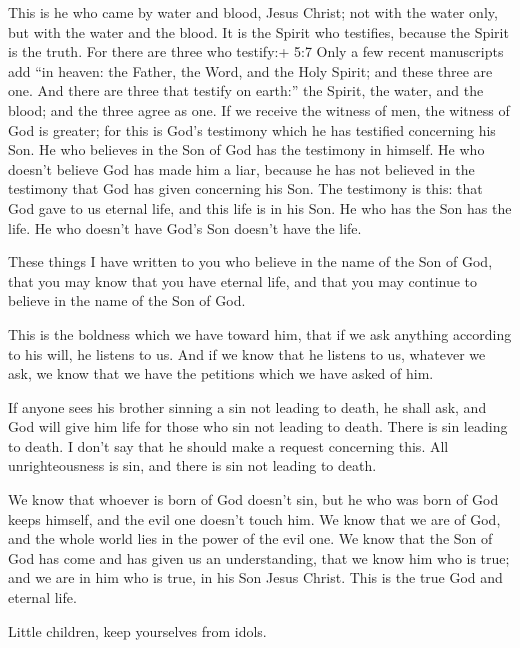  This is he who came by water and blood, Jesus Christ; not
with the water only, but with the water and the blood. It is the Spirit
who testifies, because the Spirit is the truth.  For there
are three who testify:+ 5:7 Only a few recent manuscripts add ``in
heaven: the Father, the Word, and the Holy Spirit; and these three are
one. And there are three that testify on earth:''  the
Spirit, the water, and the blood; and the three agree as one.
 If we receive the witness of men, the witness of God is
greater; for this is God's testimony which he has testified concerning
his Son.  He who believes in the Son of God has the
testimony in himself. He who doesn't believe God has made him a liar,
because he has not believed in the testimony that God has given
concerning his Son.  The testimony is this: that God gave
to us eternal life, and this life is in his Son.  He who
has the Son has the life. He who doesn't have God's Son doesn't have the
life.

 These things I have written to you who believe in the name
of the Son of God, that you may know that you have eternal life, and
that you may continue to believe in the name of the Son of God.

 This is the boldness which we have toward him, that if we
ask anything according to his will, he listens to us.  And
if we know that he listens to us, whatever we ask, we know that we have
the petitions which we have asked of him.

 If anyone sees his brother sinning a sin not leading to
death, he shall ask, and God will give him life for those who sin not
leading to death. There is sin leading to death. I don't say that he
should make a request concerning this.  All unrighteousness
is sin, and there is sin not leading to death.

 We know that whoever is born of God doesn't sin, but he
who was born of God keeps himself, and the evil one doesn't touch him.
 We know that we are of God, and the whole world lies in
the power of the evil one.  We know that the Son of God has
come and has given us an understanding, that we know him who is true;
and we are in him who is true, in his Son Jesus Christ. This is the true
God and eternal life.

 Little children, keep yourselves from idols.
